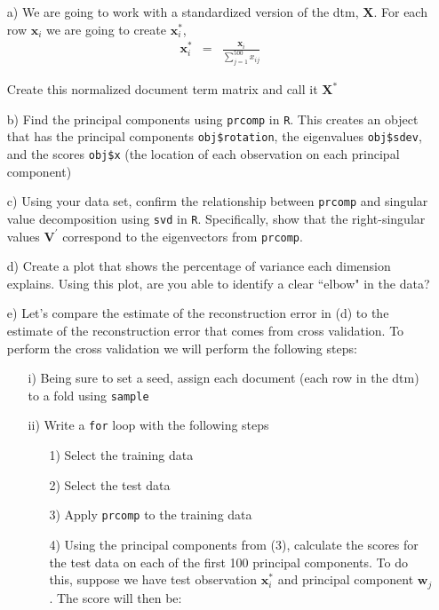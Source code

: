 \documentclass[letterpaper,12pt]{article}
\numberwithin{equation}{section}
\numberwithin{equation}{section}
\begin{document}
\begin{itemize}
\item[a)] We are going to work with a standardized version of the dtm, $\boldsymbol{X}$.  For each row $\boldsymbol{x}_{i}$ we are going to create $\boldsymbol{x}_{i}^{*}$, 
\begin{eqnarray}
\boldsymbol{x}_{i}^{*} & =& \frac{\boldsymbol{x}_{i} }{\sum_{j=1}^{500} x_{ij} } \nonumber 
\end{eqnarray}

Create this normalized document term matrix and call it $\boldsymbol{X}^{*} $
\item[b)] Find the principal components using {\tt prcomp} in {\tt R}.  This creates an object that has the principal components {\tt obj\$rotation}, the eigenvalues {\tt obj\$sdev}, and the scores {\tt obj\$x} (the location of each observation on each principal component)
\item[c)] Using your data set, confirm the relationship between {\tt prcomp} and singular value decomposition using {\tt svd} in {\tt R}. Specifically, show that the right-singular values $\boldsymbol{V}^{'}$ correspond to the eigenvectors from {\tt prcomp}. 
\item[d)] Create a plot that shows the percentage of variance each dimension explains.  Using this plot, are you able to identify a clear ``elbow" in the data? 
\item[e)] Let's compare the estimate of the reconstruction error in (d) to the estimate of the reconstruction error that comes from cross validation.  To perform the cross validation we will perform the following steps:
\begin{itemize}
\item[i)] Being sure to set a seed, assign each document (each row in the dtm) to a fold using {\tt sample}
\item[ii)] Write a {\tt for} loop with the following steps
\begin{itemize}
\item[1)] Select the training data
\item[2)] Select the test data
\item[3)] Apply {\tt prcomp} to the training data
\item[4)] Using the principal components from (3), calculate the scores for the test data on each of the first 100 principal components.  To do this, suppose we have test observation $\boldsymbol{x}_i^{*}$ and principal component $\boldsymbol{w}_j$.  The score will then be:
\begin{eqnarray}

\end{eqnarray}
\end{itemize}
\end{itemize}
\end{itemize}
\end{document}
